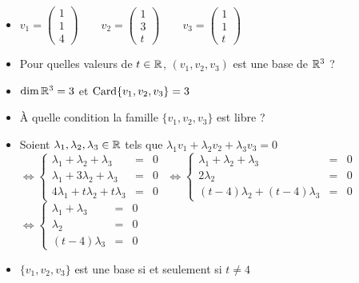 \begin{frame}

\begin{exemple}
\begin{itemize}
\item
$v_1 = \begin{pmatrix}1\\1\\4\end{pmatrix} \qquad
v_2 = \begin{pmatrix}1\\3\\t\end{pmatrix} \qquad
v_3 = \begin{pmatrix}1\\1\\t\end{pmatrix}$

\pause
\item
Pour quelles valeurs de $t\in\mathbb{R}$, $(v_1,v_2,v_3)$ est  une base de $\mathbb{R}^3$ ?

\pause
  \item $\dim \mathbb{R}^3 = 3$ et $\mathop{\text{Card}}\nolimits \{v_1,v_2,v_3\} = 3$  
  \pause
  \item \`A quelle condition la famille $\{ v_1,v_2,v_3 \}$ est libre ?
  \pause
  \item 
  Soient $\lambda_1,\lambda_2,\lambda_3 \in \mathbb{R}$ tels que $\lambda_1 v_1 + \lambda_2 v_2 + \lambda_3 v_3 = 0$
  \pause
  $\Leftrightarrow\left\{ \begin{array}{rcl}
  \lambda_1 + \lambda_2 + \lambda_3 &=& 0 \\
  \lambda_1 + 3 \lambda_2 + \lambda_3 &=& 0 \\
  4\lambda_1 + t\lambda_2 + t \lambda_3 &=& 0
  \end{array}  \right.$
  \pause  $\Leftrightarrow\left\{ \begin{array}{rcl}
  \lambda_1 + \lambda_2 + \lambda_3 &=& 0 \\
  2 \lambda_2 &=& 0 \\
  (t-4)\lambda_2 + (t-4) \lambda_3 &=& 0
  \end{array} \right.$
  \pause
  $
  \Leftrightarrow  \left\{ \begin{array}{rcl}
  \lambda_1 + \lambda_3 &=& 0 \\
  \lambda_2 &=& 0 \\
  (t-4) \lambda_3 &=& 0
  \end{array} \right.$
  
  \pause
  \item $\{ v_1,v_2,v_3 \}$ est une base si et seulement si $t\neq 4$  
\end{itemize}

\end{exemple}


\end{frame}

